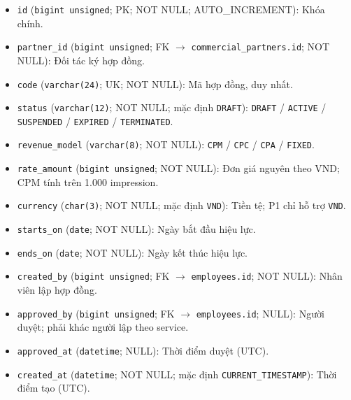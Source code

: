 \begin{itemize}

\item \texttt{id} (\texttt{bigint unsigned}; PK; NOT NULL; AUTO_INCREMENT): Khóa chính.

\item \texttt{partner\_id} (\texttt{bigint unsigned}; FK $\rightarrow$ \texttt{commercial\_partners.id}; NOT NULL): Đối tác ký hợp đồng.

\item \texttt{code} (\texttt{varchar(24)}; UK; NOT NULL): Mã hợp đồng, duy nhất.

\item \texttt{status} (\texttt{varchar(12)}; NOT NULL; mặc định \texttt{DRAFT}): \texttt{DRAFT} / \texttt{ACTIVE} / \texttt{SUSPENDED} / \texttt{EXPIRED} / \texttt{TERMINATED}.

\item \texttt{revenue\_model} (\texttt{varchar(8)}; NOT NULL): \texttt{CPM} / \texttt{CPC} / \texttt{CPA} / \texttt{FIXED}.

\item \texttt{rate\_amount} (\texttt{bigint unsigned}; NOT NULL): Đơn giá nguyên theo VND; CPM tính trên 1.000 impression.

\item \texttt{currency} (\texttt{char(3)}; NOT NULL; mặc định \texttt{VND}): Tiền tệ; P1 chỉ hỗ trợ \texttt{VND}.

\item \texttt{starts\_on} (\texttt{date}; NOT NULL): Ngày bắt đầu hiệu lực.

\item \texttt{ends\_on} (\texttt{date}; NOT NULL): Ngày kết thúc hiệu lực.

\item \texttt{created\_by} (\texttt{bigint unsigned}; FK $\rightarrow$ \texttt{employees.id}; NOT NULL): Nhân viên lập hợp đồng.

\item \texttt{approved\_by} (\texttt{bigint unsigned}; FK $\rightarrow$ \texttt{employees.id}; NULL): Người duyệt; phải khác người lập theo service.

\item \texttt{approved\_at} (\texttt{datetime}; NULL): Thời điểm duyệt (UTC).

\item \texttt{created\_at} (\texttt{datetime}; NOT NULL; mặc định \texttt{CURRENT\_TIMESTAMP}): Thời điểm tạo (UTC).

\end{itemize}

